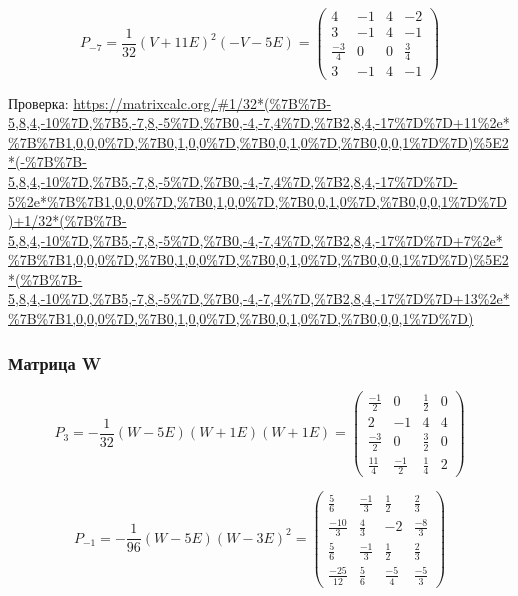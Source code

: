 \documentclass[12pt, a4paper]{article}
\begin{document}
    \begin{equation}
        P_{-7} = \frac{1}{32} (V + 11E)^2 (-V - 5E) = \left(\begin{matrix}
            4 & -1 & 4 & -2 \\
            3 & -1 & 4 & -1 \\
            \frac{-3}{4} & 0 & 0 & \frac{3}{4} \\
            3 & -1 & 4 & -1
        \end{matrix}\right)
    \end{equation}

    Проверка: \url{https://matrixcalc.org/#1/32*(%7B%7B-5,8,4,-10%7D,%7B5,-7,8,-5%7D,%7B0,-4,-7,4%7D,%7B2,8,4,-17%7D%7D+11%2e*%7B%7B1,0,0,0%7D,%7B0,1,0,0%7D,%7B0,0,1,0%7D,%7B0,0,0,1%7D%7D)%5E2*(-%7B%7B-5,8,4,-10%7D,%7B5,-7,8,-5%7D,%7B0,-4,-7,4%7D,%7B2,8,4,-17%7D%7D-5%2e*%7B%7B1,0,0,0%7D,%7B0,1,0,0%7D,%7B0,0,1,0%7D,%7B0,0,0,1%7D%7D)+1/32*(%7B%7B-5,8,4,-10%7D,%7B5,-7,8,-5%7D,%7B0,-4,-7,4%7D,%7B2,8,4,-17%7D%7D+7%2e*%7B%7B1,0,0,0%7D,%7B0,1,0,0%7D,%7B0,0,1,0%7D,%7B0,0,0,1%7D%7D)%5E2*(%7B%7B-5,8,4,-10%7D,%7B5,-7,8,-5%7D,%7B0,-4,-7,4%7D,%7B2,8,4,-17%7D%7D+13%2e*%7B%7B1,0,0,0%7D,%7B0,1,0,0%7D,%7B0,0,1,0%7D,%7B0,0,0,1%7D%7D)}


    \subsubsection{Матрица W}

    \begin{equation}
        P_{3} = -\frac{1}{32} (W - 5E) (W + 1E)(W + 1E) = \left(\begin{matrix}
            \frac{-1}{2} & 0 & \frac{1}{2} & 0 \\
            2 & -1 & 4 & 4 \\
            \frac{-3}{2} & 0 & \frac{3}{2} & 0 \\
            \frac{11}{4} & \frac{-1}{2} & \frac{1}{4} & 2
        \end{matrix}\right)
    \end{equation}


    \begin{equation}
        P_{-1} = -\frac{1}{96} (W - 5E) (W - 3E)^2 = \left(\begin{matrix}
            \frac{5}{6} & \frac{-1}{3} & \frac{1}{2} & \frac{2}{3} \\
            \frac{-10}{3} & \frac{4}{3} & -2 & \frac{-8}{3} \\
            \frac{5}{6} & \frac{-1}{3} & \frac{1}{2} & \frac{2}{3} \\
            \frac{-25}{12} & \frac{5}{6} & \frac{-5}{4} & \frac{-5}{3}
        \end{matrix}\right)
    \end{equation}
\end{document}
